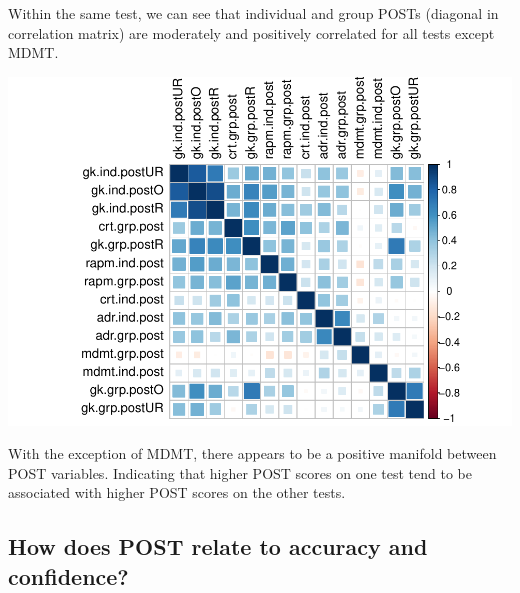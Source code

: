 \documentclass[]{article}
\begin{document}
Within the same test, we can see that individual and group POSTs
(diagonal in correlation matrix) are moderately and positively
correlated for all tests except MDMT.

\includegraphics{corr_analyses_files/figure-latex/post2-1.pdf}

With the exception of MDMT, there appears to be a positive manifold
between POST variables. Indicating that higher POST scores on one test
tend to be associated with higher POST scores on the other tests.

\subsection{How does POST relate to accuracy and
confidence?}\label{how-does-post-relate-to-accuracy-and-confidence}
\end{document}
